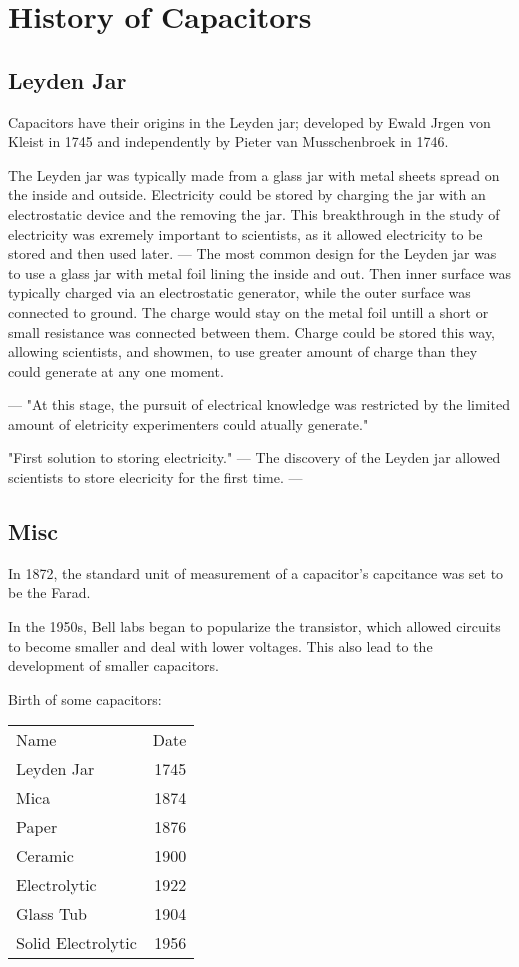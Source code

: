 \section {History of Capacitors}
\subsection{Leyden Jar}
Capacitors have their origins in the Leyden jar; developed by Ewald Jrgen von Kleist in 1745 and independently by Pieter van Musschenbroek in 1746. \cite{ieee_hist}

The Leyden jar was typically made from a glass jar with metal sheets spread on the inside and outside. Electricity could be stored by charging the jar with an electrostatic device and the removing the jar. This breakthrough in the study of electricity was exremely important to scientists, as it allowed electricity to be stored and then used later.
\cite{ieee_hist} 
---
The most common design for the Leyden jar was to use a glass jar with metal foil lining the inside and out. Then inner surface was typically charged via an electrostatic generator, while the outer surface was connected to ground. The charge would stay on the metal foil untill a short or small resistance was connected between them. Charge could be stored this way, allowing scientists, and showmen, to use greater amount of charge than they could generate at any one moment.

---
"At this stage, the pursuit of electrical knowledge was restricted by the limited amount of eletricity experimenters could atually generate."
\cite{empLight}

"First solution to storing electricity."
---
The discovery of the Leyden jar allowed scientists to store elecricity for the first time. \cite{wws_hist}
---

\subsection{Misc}
In 1872, the standard unit of measurement of a capacitor's capcitance was set to be the Farad. \cite{ieee_hist} 

In the 1950s, Bell labs began to popularize the transistor, which allowed circuits to become smaller and deal with lower voltages. This also lead to the development of smaller capacitors. \cite[f.~12]{dumInv}

Birth of some capacitors:

\begin{tabular} { l  r}
Name & Date \\
Leyden Jar   & 1745 \\
Mica         & 1874 \\
Paper        & 1876 \\
Ceramic      & 1900 \\
Electrolytic & 1922 \\
Glass Tub    & 1904 \\
Solid Electrolytic & 1956 \\
\end{tabular} \cite[f.~19-25]{dumInv}



